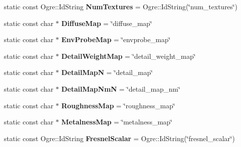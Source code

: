 \begin{DoxyCompactItemize}
static const Ogre\+::\+Id\+String {\bfseries Num\+Textures} = Ogre\+::\+Id\+String(\char`\"{}num\+\_\+textures\char`\"{})
\item 
\mbox{\label{struct_terrain_property_a9b738b34017c423e3f86fb2597c155b4}} 
static const char $\ast$ {\bfseries Diffuse\+Map} = \char`\"{}diffuse\+\_\+map\char`\"{}
\item 
\mbox{\label{struct_terrain_property_aa2b0b5649921f282672b2e5e750ac962}} 
static const char $\ast$ {\bfseries Env\+Probe\+Map} = \char`\"{}envprobe\+\_\+map\char`\"{}
\item 
\mbox{\label{struct_terrain_property_afd2efb252f68c6b60018f39e8c2925f9}} 
static const char $\ast$ {\bfseries Detail\+Weight\+Map} = \char`\"{}detail\+\_\+weight\+\_\+map\char`\"{}
\item 
\mbox{\label{struct_terrain_property_a4106f05aa014fec64fe6df28ab29437b}} 
static const char $\ast$ {\bfseries Detail\+MapN} = \char`\"{}detail\+\_\+map\char`\"{}
\item 
\mbox{\label{struct_terrain_property_ae519d451e95671036d039c74d04e6be8}} 
static const char $\ast$ {\bfseries Detail\+Map\+NmN} = \char`\"{}detail\+\_\+map\+\_\+nm\char`\"{}
\item 
\mbox{\label{struct_terrain_property_a3450d96a818009432903ea828a734454}} 
static const char $\ast$ {\bfseries Roughness\+Map} = \char`\"{}roughness\+\_\+map\char`\"{}
\item 
\mbox{\label{struct_terrain_property_a06fdb464065168c81de14c5a62d9e90d}} 
static const char $\ast$ {\bfseries Metalness\+Map} = \char`\"{}metalness\+\_\+map\char`\"{}
\item 
\mbox{\label{struct_terrain_property_aa4c1809651322a7fbf1c195b1722258e}} 
static const Ogre\+::\+Id\+String {\bfseries Fresnel\+Scalar} = Ogre\+::\+Id\+String(\char`\"{}fresnel\+\_\+scalar\char`\"{})
\item 
\mbox{\label{struct_terrain_property_a99edf6788f3c16492d242822c4af107e}} 

\end{DoxyCompactItemize}
